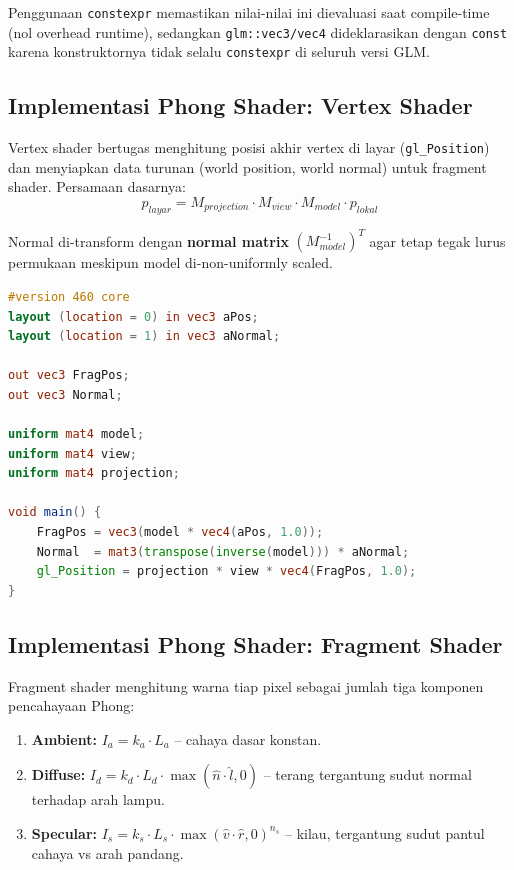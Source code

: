 \documentclass[12pt,a4paper]{article}
\begin{document}
Penggunaan \texttt{constexpr} memastikan nilai-nilai ini dievaluasi saat compile-time (nol overhead runtime), sedangkan \texttt{glm::vec3/vec4} dideklarasikan dengan \texttt{const} karena konstruktornya tidak selalu \texttt{constexpr} di seluruh versi GLM.

\subsection{Implementasi Phong Shader: Vertex Shader}

Vertex shader bertugas menghitung posisi akhir vertex di layar (\texttt{gl\_Position}) dan menyiapkan data turunan (world position, world normal) untuk fragment shader. Persamaan dasarnya:
$$ p_{layar} = M_{projection} \cdot M_{view} \cdot M_{model} \cdot p_{lokal} $$

Normal di-transform dengan \textbf{normal matrix} $(M_{model}^{-1})^T$ agar tetap tegak lurus permukaan meskipun model di-non-uniformly scaled.

\begin{lstlisting}[language=GLSL]
#version 460 core
layout (location = 0) in vec3 aPos;
layout (location = 1) in vec3 aNormal;

out vec3 FragPos;
out vec3 Normal;

uniform mat4 model;
uniform mat4 view;
uniform mat4 projection;

void main() {
    FragPos = vec3(model * vec4(aPos, 1.0));
    Normal  = mat3(transpose(inverse(model))) * aNormal;
    gl_Position = projection * view * vec4(FragPos, 1.0);
}
\end{lstlisting}

\subsection{Implementasi Phong Shader: Fragment Shader}

Fragment shader menghitung warna tiap pixel sebagai jumlah tiga komponen pencahayaan Phong:

\begin{enumerate}
    \item \textbf{Ambient:} $I_a = k_a \cdot L_a$ -- cahaya dasar konstan.
    \item \textbf{Diffuse:} $I_d = k_d \cdot L_d \cdot \max(\hat{n} \cdot \hat{l}, 0)$ -- terang tergantung sudut normal terhadap arah lampu.
    \item \textbf{Specular:} $I_s = k_s \cdot L_s \cdot \max(\hat{v} \cdot \hat{r}, 0)^{n_s}$ -- kilau, tergantung sudut pantul cahaya vs arah pandang.
\end{enumerate}
\end{document}

